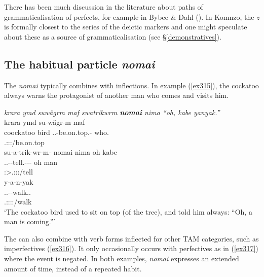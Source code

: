 There has been much discussion in the literature about paths of grammaticalisation of perfects, for example in Bybee \& Dahl (\citeyear{Bybee:1989hk}). In Komnzo, the   \emph{z} is formally closest to the  series of the deictic markers and one might speculate about these as a source of grammaticalisation (see \S\ref{demonstratives}).

\subsection{The habitual particle \emph{nomai}}\label{habitualnomai}

The   \emph{nomai} typically combines with  inflections. In example (\ref{ex315}), the cockatoo always warns the protagonist of another man who comes and visits him.

\begin{exe}
	\ex \emph{krara ymd suwägrm maf swatrikwrm \textbf{nomai} nima ``oh, kabe yanyak.''}\\
	\glll krara ymd su-wägr-m maf\\
	coockatoo bird \Tsg.\Masc.\Betaone-be.on.top.\Ndu-\Dur{} who.\Erg{}\\
	{} {} \footnotesize{\Tsg.\Masc:\Sbj:\Pst:\Dur/be.on.top} {}\\
	\sn
	\glll su-a-trik-wr-m-\Zero{} nomai nima oh kabe\\
	\Tsg.\Masc.\Betaone-\Vc-tell.\Ext-\Ndu-\Dur-\Stsg{} \Hab{} \Quot{} oh man\\
	\footnotesize{\Stsg:\Sbj>\Tsg.\Masc:\Io:\Pst:\Dur/tell} {} {} {} {}\\
	\sn
	\glll y-a-n-yak\\
	\Tsg.\Masc.\Alph-\Venit-walk.\Ext.\Ndu{}\\
	\footnotesize{\Tsg.\Masc:\Sbj:\Nonpast:\Ipfv:\Venit/walk}\\
	\trans `The cockatoo bird used to sit on top (of the tree), and told him always: ``Oh, a man is coming.''' 
	\label{ex315}
\end{exe}

The  can also combine with verb forms inflected for other TAM categories, such as imperfectives (\ref{ex316}). It only occasionally occurs with perfectives as in (\ref{ex317}) where the event is negated. In both examples, \emph{nomai} expresses an extended amount of time, instead of a repeated habit.

